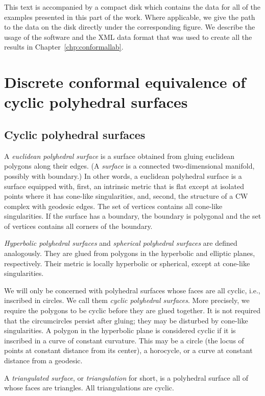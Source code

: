 \documentclass[Thesis]{subfiles}
\begin{document}
This text is accompanied by a compact disk which contains the data for all of the examples presented in this part of the work. 
Where applicable, we give the path to the data on the disk directly under the corresponding figure.
We describe the usage of the software and the XML data format that was used to create all the results in Chapter~\ref{chp:conformallab}.

\section{Discrete conformal equivalence of cyclic polyhedral surfaces}
\label{sec:basic_definitions}

\subsection{Cyclic polyhedral surfaces }

A \emph{euclidean polyhedral surface} is a surface obtained from
gluing euclidean polygons along their edges. (A \emph{surface} is a
connected two-dimensional manifold, possibly with boundary.)  In other
words, a euclidean polyhedral surface is a surface equipped with,
first, an intrinsic metric that is flat except at isolated points
where it has cone-like singularities, and, second, the structure of a
CW complex with geodesic edges. The set of vertices contains all
cone-like singularities. If the surface has a boundary, the boundary
is polygonal and the set of vertices contains all corners of the
boundary.

\emph{Hyperbolic polyhedral surfaces} and \emph{spherical polyhedral
surfaces} are defined analogously. They are glued from polygons in
the hyperbolic and elliptic planes, respectively. Their metric is
locally hyperbolic or spherical, except at cone-like singularities.

We will only be concerned with polyhedral surfaces whose faces are all
cyclic, i.e., inscribed in circles. We call them \emph{cyclic
polyhedral surfaces}. More precisely, we require the polygons to be
cyclic before they are glued together. It is not required that the
circumcircles persist after gluing; they may be disturbed by cone-like
singularities. A polygon in the hyperbolic plane is considered cyclic
if it is inscribed in a curve of constant curvature. This may be a
circle (the locus of points at constant distance from its center), a
horocycle, or a curve at constant distance from a geodesic.

A \emph{triangulated surface}, or \emph{triangulation} for short, is a
polyhedral surface all of whose faces are triangles.  All
triangulations are cyclic.
\end{document}
